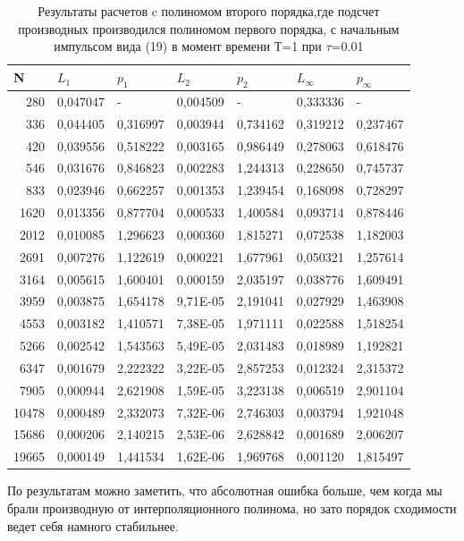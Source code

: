 \documentclass[14pt]{article}
\begin{document}
\begin{table}[H]
\caption{Результаты расчетов c полиномом второго порядка,где подсчет производных производился полиномом первого порядка, с начальным импульсом вида (19) в момент времени Т=1 при $\tau$=0.01}
\begin{tabular}{|r|l|l|l|l|l|l|}
\hline
\multicolumn{1}{|l|}{N} & \multicolumn{1}{l|}{$L_1$}        & \multicolumn{1}{l|}{$p_1$} & \multicolumn{1}{l|}{$L_2$}     & \multicolumn{1}{l|}{$p_2$} & \multicolumn{1}{l|}{$L_\infty$} & \multicolumn{1}{l|}{$p_\infty$} \\ \hline
280                     & 0,047047 & -        & 0,004509 & -        & 0,333336 & -        \\ \hline
336                     & 0,044405 & 0,316997 & 0,003944 & 0,734162 & 0,319212 & 0,237467 \\ \hline
420                     & 0,039556 & 0,518222 & 0,003165 & 0,986449 & 0,278063 & 0,618476 \\ \hline
546                     & 0,031676 & 0,846823 & 0,002283 & 1,244313 & 0,228650 & 0,745737 \\ \hline
833                     & 0,023946 & 0,662257 & 0,001353 & 1,239454 & 0,168098 & 0,728297 \\ \hline
1620                    & 0,013356 & 0,877704 & 0,000533 & 1,400584 & 0,093714 & 0,878446 \\ \hline
2012                    & 0,010085 & 1,296623 & 0,000360 & 1,815271 & 0,072538 & 1,182003 \\ \hline
2691                    & 0,007276 & 1,122619 & 0,000221 & 1,677961 & 0,050321 & 1,257614 \\ \hline
3164                    & 0,005615 & 1,600401 & 0,000159 & 2,035197 & 0,038776 & 1,609491 \\ \hline
3959                    & 0,003875 & 1,654178 & 9,71E-05 & 2,191041 & 0,027929 & 1,463908 \\ \hline
4553                    & 0,003182 & 1,410571 & 7,38E-05 & 1,971111 & 0,022588 & 1,518254 \\ \hline
5266                    & 0,002542 & 1,543563 & 5,49E-05 & 2,031483 & 0,018989 & 1,192821 \\ \hline
6347                    & 0,001679 & 2,222322 & 3,22E-05 & 2,857253 & 0,012324 & 2,315372 \\ \hline
7905                    & 0,000944 & 2,621908 & 1,59E-05 & 3,223138 & 0,006519 & 2,901104 \\ \hline
10478                   & 0,000489 & 2,332073 & 7,32E-06 & 2,746303 & 0,003794 & 1,921048 \\ \hline
15686                   & 0,000206 & 2,140215 & 2,53E-06 & 2,628842 & 0,001689 & 2,006207 \\ \hline
19665                   & 0,000149 & 1,441534 & 1,62E-06 & 1,969768 & 0,001120 & 1,815497 \\ \hline
\end{tabular}
\end{table}
По результатам можно заметить, что абсолютная ошибка больше, чем когда мы брали производную от интерполяционного полинома, но зато порядок сходимости ведет себя намного стабильнее.
\end{document}
